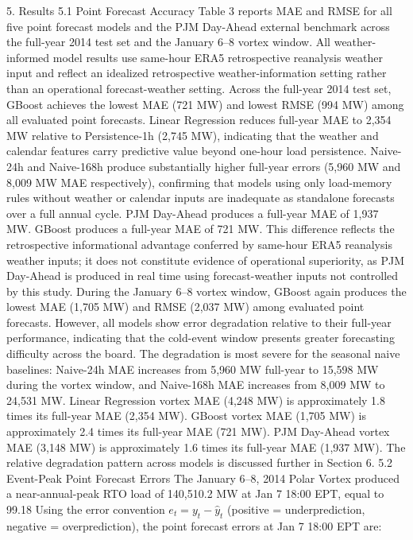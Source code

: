 5. Results
5.1 Point Forecast Accuracy
Table 3 reports MAE and RMSE for all five point forecast models and the PJM Day-Ahead external benchmark across the full-year 2014 test set and the January 6–8 vortex window. All weather-informed model results use same-hour ERA5 retrospective reanalysis weather input and reflect an idealized retrospective weather-information setting rather than an operational forecast-weather setting.
Across the full-year 2014 test set, GBoost achieves the lowest MAE (721 MW) and lowest RMSE (994 MW) among all evaluated point forecasts. Linear Regression reduces full-year MAE to 2,354 MW relative to Persistence-1h (2,745 MW), indicating that the weather and calendar features carry predictive value beyond one-hour load persistence. Naive-24h and Naive-168h produce substantially higher full-year errors (5,960 MW and 8,009 MW MAE respectively), confirming that models using only load-memory rules without weather or calendar inputs are inadequate as standalone forecasts over a full annual cycle.
PJM Day-Ahead produces a full-year MAE of 1,937 MW. GBoost produces a full-year MAE of 721 MW. This difference reflects the retrospective informational advantage conferred by same-hour ERA5 reanalysis weather inputs; it does not constitute evidence of operational superiority, as PJM Day-Ahead is produced in real time using forecast-weather inputs not controlled by this study.
During the January 6–8 vortex window, GBoost again produces the lowest MAE (1,705 MW) and RMSE (2,037 MW) among evaluated point forecasts. However, all models show error degradation relative to their full-year performance, indicating that the cold-event window presents greater forecasting difficulty across the board. The degradation is most severe for the seasonal naive baselines: Naive-24h MAE increases from 5,960 MW full-year to 15,598 MW during the vortex window, and Naive-168h MAE increases from 8,009 MW to 24,531 MW. Linear Regression vortex MAE (4,248 MW) is approximately 1.8 times its full-year MAE (2,354 MW). GBoost vortex MAE (1,705 MW) is approximately 2.4 times its full-year MAE (721 MW). PJM Day-Ahead vortex MAE (3,148 MW) is approximately 1.6 times its full-year MAE (1,937 MW). The relative degradation pattern across models is discussed further in Section 6.
5.2 Event-Peak Point Forecast Errors
The January 6–8, 2014 Polar Vortex produced a near-annual-peak RTO load of 140,510.2 MW at Jan 7 18:00 EPT, equal to 99.18%
Using the error convention $e_t = y_t - \hat{y}_t$ (positive = underprediction, negative = overprediction), the point forecast errors at Jan 7 18:00 EPT are:


